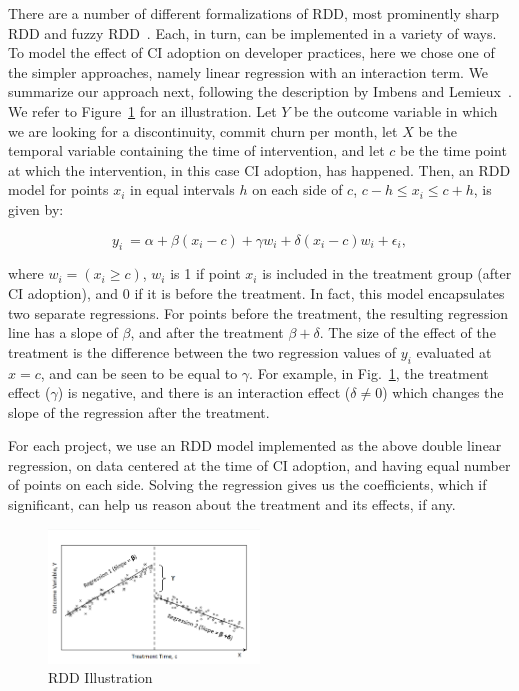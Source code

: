 There are a number of different formalizations of RDD, most prominently 
sharp RDD and fuzzy RDD~\cite{imbens2008regression}.
Each, in turn, can be implemented in a variety of ways.
To model the effect of CI adoption on developer practices, here we chose one 
of the simpler approaches, namely linear regression with an interaction term.
We summarize our approach next, following the description by Imbens and 
Lemieux~\cite{imbens2008regression}.
We refer to Figure~\ref{RDDIllustration} for an illustration.
Let $Y$ be the outcome variable in which we are looking for a discontinuity, 
\eg commit churn per month, let $X$ be the temporal variable containing the 
time of intervention, and let $c$ be the time point at which the intervention, in 
this case CI adoption, has happened.
Then, an RDD model for points $x_i$ in equal intervals $h$ on each side of 
$c$, $c-h \le x_i \le c+h$, is given by:

\[y_i \ = \alpha + \beta(x_i-c) + \gamma w_i + \delta(x_i-c)w_i + \epsilon_i,\]

\noindent where $w_i = (x_i \geq c)$, \ie $w_i$ is 1 if point $x_i$ is included in 
the treatment group (\eg after CI adoption), and 0 if it is before the treatment.
In fact, this model encapsulates two separate regressions.
For points before the treatment, the resulting regression line has a slope of 
$\beta$, and after the treatment $\beta + \delta$.
The size of the effect of the treatment is the difference between the two 
regression values of $y_i$ evaluated at $x=c$, and can be seen to be equal 
to $\gamma$.
For example, in Fig.~\ref{RDDIllustration}, the treatment effect ($\gamma$) is negative, and there is an interaction effect ($\delta \neq 0$) which changes the slope of the regression after the treatment.

For each project, we use an RDD model implemented as the above 
double linear regression, on data centered at the time of CI adoption, and 
having equal number of points on each side.
Solving the regression gives us the coefficients, which if significant, can help us reason about the treatment and its effects, if any.
 

\begin{figure}[t]
	\centering
	\includegraphics[width=0.5\textwidth, clip=true, trim=0 15 15 50]{RDD_plot.png}
	\caption{RDD Illustration}
	\label{RDDIllustration}
\end{figure}

